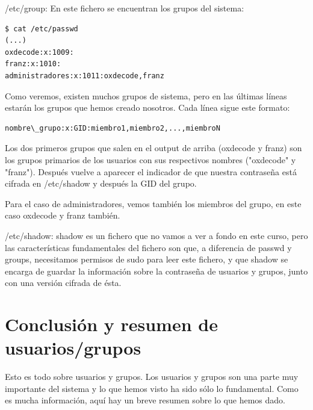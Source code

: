 /etc/group: En este fichero se encuentran los grupos del sistema:

\begin{tcolorbox-code}
\begin{lstlisting}
$ cat /etc/passwd
(...)
oxdecode:x:1009:
franz:x:1010:
administradores:x:1011:oxdecode,franz
\end{lstlisting}
\end{tcolorbox-code}

Como veremos, existen muchos grupos de sistema, pero en las últimas líneas estarán los grupos que hemos creado nosotros. Cada línea sigue este formato:

\begin{tcolorbox-code}
\begin{lstlisting}
nombre\_grupo:x:GID:miembro1,miembro2,...,miembroN
\end{lstlisting}
\end{tcolorbox-code}

Los dos primeros grupos que salen en el output de arriba (oxdecode y franz) son los grupos primarios de los usuarios con sus respectivos nombres ("oxdecode" y "franz"). Después vuelve a aparecer el indicador de que nuestra contraseña está cifrada en /etc/shadow y después la GID del grupo.

Para el caso de administradores, vemos también los miembros del grupo, en este caso oxdecode y franz también.

/etc/shadow: shadow es un fichero que no vamos a ver a fondo en este curso, pero las características fundamentales del fichero son que, a diferencia de passwd y groups, necesitamos permisos de sudo para leer este fichero, y que shadow se encarga de guardar la información sobre la contraseña de usuarios y grupos, junto con una versión cifrada de ésta.

\section{Conclusión y resumen de usuarios/grupos}
Esto es todo sobre usuarios y grupos. Los usuarios y grupos son una parte muy importante del sistema y lo que hemos visto ha sido sólo lo fundamental. Como es mucha información, aquí hay un breve resumen sobre lo que hemos dado.

